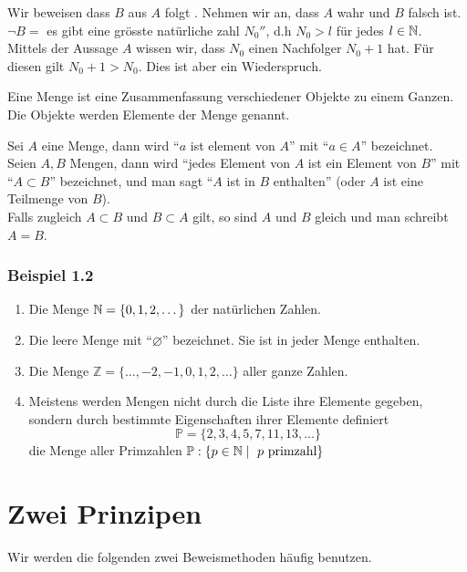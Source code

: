 \noindent Wir beweisen dass $B$ aus $A$ folgt . Nehmen wir an, dass $A$ wahr und $B$ falsch ist. \\

\noindent $\lnot B=$ es gibt eine grösste natürliche zahl $N_0''$, d.h $N_0>l$ für jedes $l \in \mathbb{N}$.\\

Mittels der Aussage $A$ wissen wir, dass $N_0$ einen Nachfolger $N_0 +1$ hat. Für diesen gilt $N_0+1>N_0$. Dies ist aber ein Wiederspruch.

\begin{definition}{1.1}
Eine Menge ist eine Zusammenfassung verschiedener Objekte zu einem Ganzen.\\
Die Objekte werden Elemente der Menge genannt. 
\end{definition}

Sei $A$ eine Menge, dann wird ``$a$ ist element von $A$'' mit ``$a\in A$'' bezeichnet.\\
Seien $A,B$ Mengen, dann wird ``jedes Element von $A$ ist ein Element von $B$'' mit ``$A\subset B$'' bezeichnet, und man sagt ``$A$ ist in $B$ enthalten'' (oder $A$ ist eine Teilmenge von $B$). \\

Falls zugleich $A\subset B$ und $B\subset A$ gilt, so sind $A$ und $B$ gleich und man schreibt $A=B$. 

\subsubsection*{Beispiel 1.2}
\begin{enumerate}
	\item Die Menge $\mathbb{N}=\{0,1,2,\dots\}$ der natürlichen Zahlen.
	\item Die leere Menge mit ``$\varnothing$'' bezeichnet. Sie ist in jeder Menge enthalten.
	\item Die Menge $\mathbb{Z}=\{\dots,-2,-1,0,1,2,\dots\}$ aller ganze Zahlen.
	\item Meistens werden Mengen nicht durch die Liste ihre Elemente gegeben, sondern durch bestimmte Eigenschaften ihrer Elemente definiert \[\mathbb{P}=\{2,3,4,5,7,11,13,\dots\}\] die Menge aller Primzahlen $\mathbb{P}:\{p\in\mathbb{N}\mid\text{ $p$ primzahl}\}$
\end{enumerate}
\section{Zwei Prinzipen}
Wir werden die folgenden zwei Beweismethoden häufig benutzen.

